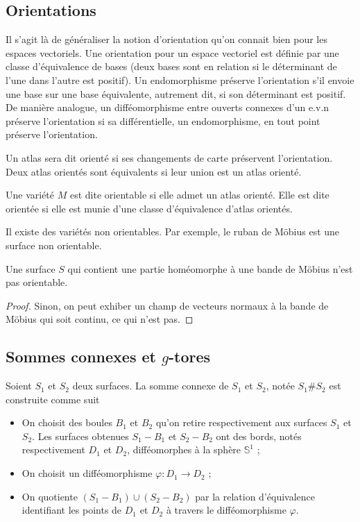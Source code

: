 \subsection{Orientations}
Il s'agit là de généraliser la notion d'orientation qu'on connait bien pour les 
espaces vectoriels.  
Une orientation pour un espace vectoriel est définie par une classe d'équivalence 
de bases (deux bases sont en relation si le déterminant de l'une dans l'autre est positif). 
Un endomorphisme préserve l'orientation s'il envoie une base sur une base équivalente, 
autrement dit, si son déterminant est positif. 
De manière analogue, un difféomorphisme entre ouverts connexes d'un e.v.n préserve 
l'orientation si sa différentielle, un endomorphisme, en tout point préserve l'orientation.

Un atlas sera dit orienté si ses changements de carte préservent l'orientation. 
Deux atlas orientés sont équivalents si leur union est un atlas orienté.
\begin{defi}
    Une variété $M$ est dite orientable si elle admet un atlas orienté. 
    Elle est dite orientée si elle est munie d'une classe d'équivalence 
    d'atlas orientés.
\end{defi}

Il existe des variétés non orientables. Par exemple, le ruban de Möbius est une surface 
non orientable.

\begin{prop}
    Une surface $S$ qui contient une partie homéomorphe à une bande de Möbius n'est pas 
    orientable.
\end{prop}

\begin{proof}
    Sinon, on peut exhiber un champ de vecteurs normaux à la bande de Möbius qui soit continu, 
    ce qui n'est pas. 
\end{proof}



\subsection{Sommes connexes et $g$-tores}
\begin{defi}
    Soient $S_1$ et $S_2$ deux surfaces. 
    La somme connexe de $S_1$ et $S_2$, notée $S_1\#S_2$ est construite comme suit 
    \begin{itemize}
        \item On choisit des boules $B_1$ et $B_2$ qu'on retire respectivement aux surfaces 
        $S_1$ et $S_2$.
        Les surfaces obtenues $S_1-B_1$ et $S_2-B_2$ ont des bords, notés respectivement $D_1$ 
        et $D_2$, difféomorphes à la sphère $\mathbb S^1$ ;
        \item On choisit un difféomorphisme $\varphi:D_1\to D_2$ ;
        \item On quotiente $(S_1-B_1)\cup(S_2-B_2)$ par la relation d'équivalence identifiant 
        les points de $D_1$ et $D_2$ à travers le difféomorphisme $\varphi$.
    \end{itemize}
\end{defi}

